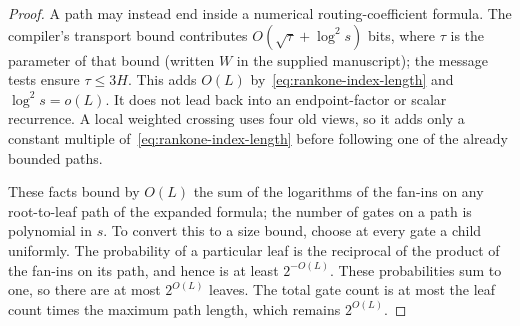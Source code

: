 \documentclass[11pt]{article}
\theoremstyle{definition}
\theoremstyle{remark}
\begin{document}
\begin{proof}
A path may instead end inside a numerical routing-coefficient
formula. The compiler's transport bound contributes
$O(\sqrt\tau+\log^2s)$ bits, where $\tau$ is the parameter of that
bound (written $W$ in the supplied manuscript); the message tests
ensure $\tau\le3H$. This adds $O(L)$ by~\eqref{eq:rankone-index-length} and
$\log^2s=o(L)$. It does not lead back into an endpoint-factor
or scalar recurrence. A local weighted crossing uses four old
views, so it adds only a constant multiple
of~\eqref{eq:rankone-index-length} before following
one of the already bounded paths.

These facts bound by $O(L)$ the sum of the logarithms of the
fan-ins on any root-to-leaf path of the expanded formula; the
number of gates on a path is polynomial in $s$. To convert this
to a size bound, choose at every gate a child uniformly. The
probability of a particular leaf is the reciprocal of the product
of the fan-ins on its path, and hence is at least $2^{-O(L)}$.
These probabilities sum to one, so there are at most $2^{O(L)}$
leaves. The total gate count is at most the leaf count times the
maximum path length, which remains $2^{O(L)}$.
\end{proof}
\end{document}
